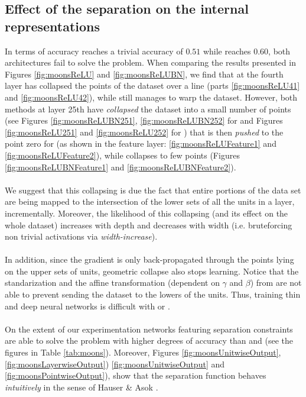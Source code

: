 \subsection{Effect of the separation on the internal representations}\label{subsec:internalRepresentation}

In terms of accuracy \ReLU reaches a trivial accuracy of $0.51$ while \ReLUBN reaches $0.60$, both architectures fail to solve the problem. When comparing the results presented in Figures \ref{fig:moonsReLU} and \ref{fig:moonsReLUBN}, we find that at the fourth layer \ReLU has collapsed the points of the dataset over a line (parts \ref{fig:moonsReLU41} and \ref{fig:moonsReLU42}), while \ReLUBN still manages to warp the dataset. However, both methods at layer 25th have \emph{collapsed} the dataset into a small number of points (see Figures \ref{fig:moonsReLUBN251}, \ref{fig:moonsReLUBN252} for \ReLUBN and Figures \ref{fig:moonsReLU251} and \ref{fig:moonsReLU252} for \ReLU) that is then \emph{pushed} to the point zero for \ReLU (as shown in the feature layer: \ref{fig:moonsReLUFeature1} and \ref{fig:moonsReLUFeature2}), while \ReLUBN collapses to few points (Figures \ref{fig:moonsReLUBNFeature1} and \ref{fig:moonsReLUBNFeature2}). 
\\\\
We suggest that this collapsing is due the fact that entire portions of the data set are being mapped to the intersection of the lower sets of all the units in a layer, incrementally. Moreover, the likelihood of this collapsing (and its effect on the whole dataset) increases with depth and decreases with width (i.e. bruteforcing non trivial activations via \emph{width-increase}). 
\\\\
In addition, since the gradient is only back-propagated through the points lying on the upper sets of units, geometric collapse also stops learning. Notice that the standarization and the affine transformation (dependent on $\gamma$ and $\beta$) from \ReLUBN are not able to prevent sending the dataset to the lowers of the units. Thus, training thin and deep neural networks is difficult with \ReLU or \ReLUBN.
\\\\
On the extent of our experimentation  \ReLU networks featuring separation constraints are able to solve the problem with higher degrees of accuracy than \ReLU and \ReLUBN (see the figures in Table \ref{tab:moons}). Moreover, Figures \ref{fig:moonsUnitwiseOutput}, \ref{fig:moonsLayerwiseOutput}) \ref{fig:moonsUnitwiseOutput} and \ref{fig:moonsPointwiseOutput}), show that the separation function behaves \emph{intuitively} in the sense of Hauser \& Asok \cite{hauserAsok}. 
